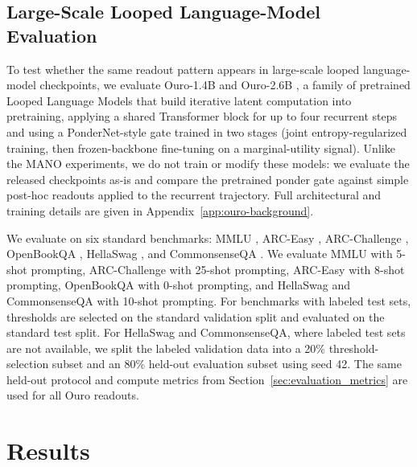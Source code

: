 \documentclass[10pt]{article} %
\begin{document}
\subsection{Large-Scale Looped Language-Model Evaluation}
\label{sec:large_scale_methodology}

To test whether the same readout pattern appears in large-scale looped language-model checkpoints, we evaluate Ouro-1.4B and Ouro-2.6B \citep{Ouro}, a family of pretrained Looped Language Models that build iterative latent computation into pretraining, applying a shared Transformer block for up to four recurrent steps and using a PonderNet-style gate trained in two stages (joint entropy-regularized training, then frozen-backbone fine-tuning on a marginal-utility signal). Unlike the MANO experiments, we do not train or modify these models: we evaluate the released checkpoints as-is and compare the pretrained ponder gate against simple post-hoc readouts applied to the recurrent trajectory. Full architectural and training details are given in Appendix~\ref{app:ouro-background}.

We evaluate on six standard benchmarks: MMLU \citep{hendrycks2021measuringmassivemultitasklanguage}, ARC-Easy \citep{clark2018thinksolvedquestionanswering}, ARC-Challenge \citep{clark2018thinksolvedquestionanswering}, OpenBookQA \citep{mihaylov2018suitarmorconductelectricity}, HellaSwag \citep{zellers2019hellaswagmachinereallyfinish}, and CommonsenseQA \citep{talmor2019commonsenseqaquestionansweringchallenge}. We evaluate MMLU with 5-shot prompting, ARC-Challenge with 25-shot prompting, ARC-Easy with 8-shot prompting, OpenBookQA with 0-shot prompting, and HellaSwag and CommonsenseQA with 10-shot prompting. For benchmarks with labeled test sets, thresholds are selected on the standard validation split and evaluated on the standard test split. For HellaSwag and CommonsenseQA, where labeled test sets are not available, we split the labeled validation data into a 20\% threshold-selection subset and an 80\% held-out evaluation subset using seed 42. The same held-out protocol and compute metrics from Section~\ref{sec:evaluation_metrics} are used for all Ouro readouts.

\section{Results}
\end{document}

